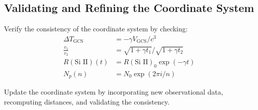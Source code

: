 \documentclass{article}
\begin{document}
\subsection*{Validating and Refining the Coordinate System}

Verify the consistency of the coordinate system by checking:
\begin{align}
\Delta T_\text{GCS} &= -\gamma V_\text{GCS} / c^3 \\
\frac{v_1}{v_2} &= \sqrt{1 + \gamma t_1} / \sqrt{1 + \gamma t_2} \\
R(\text{Si II})(t) &= R(\text{Si II})_0 \exp(-\gamma t) \\
N_p(n) &= N_0 \exp(2\pi i /n)
\end{align}

Update the coordinate system by incorporating new observational data, recomputing distances, and validating the consistency.
\end{document}
